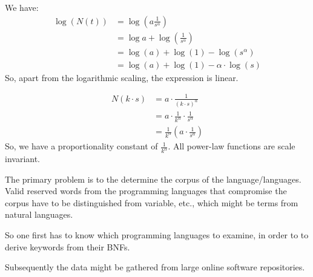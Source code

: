 \documentclass[10pt,a4paper,boxed]{hmcpset}
\begin{document}
\begin{problem}[Assignment 37]
\end{problem}
We have:
\begin{align*}
	\log(N(t)) & = \log \left( a \frac{1}{s^\alpha} \right) \\
			   & = \log a + \log \left( \frac{1}{s^\alpha} \right) \\
			   & = \log (a) + \log (1) - \log \left( s^\alpha \right) \\
			   & = \log (a) + \log (1) - \alpha \cdot \log \left( s \right)
\end{align*}
So, apart from the logarithmic scaling, the expression is linear.
\begin{solution}
\end{solution}


\begin{problem}[Assignment 38]
\end{problem}
\begin{solution}
\begin{align*}
	N(k \cdot s) & = a \cdot \frac{1}{\left( k \cdot s \right)^\alpha} \\
			     & = a \cdot \frac{1}{k^\alpha} \cdot \frac{1}{s^\alpha} \\
			     & = \frac{1}{k^\alpha} \left( a \cdot \frac{1}{s^\alpha} \right)
\end{align*}
So, we have a proportionality constant of $\frac{1}{k^\alpha}$.
All power-law functions are scale invariant.
\end{solution}


\begin{problem}[Assignment 39]
\end{problem}
\begin{solution}
The primary problem is to the determine the corpus of the language/languages. Valid reserved words from the programming languages that compromise the corpus have to be distinguished from variable, etc., which might be terms from natural languages.

So one first has to know which programming languages to examine, in order to to derive keywords from their BNFs.

Subsequently the data might be gathered from large online software repositories.
\end{solution}
\end{document}
